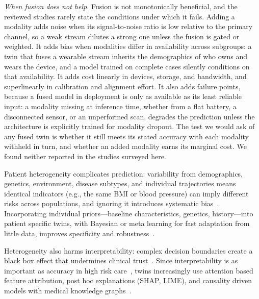 \documentclass[journal]{IEEEtran}
\begin{document}
\emph{When fusion does not help.} Fusion is not monotonically beneficial, and the reviewed studies rarely state the conditions under which it fails. Adding a modality adds noise when its signal-to-noise ratio is low relative to the primary channel, so a weak stream dilutes a strong one unless the fusion is gated or weighted. It adds bias when modalities differ in availability across subgroups: a twin that fuses a wearable stream inherits the demographics of who owns and wears the device, and a model trained on complete cases silently conditions on that availability. It adds cost linearly in devices, storage, and bandwidth, and superlinearly in calibration and alignment effort. It also adds failure points, because a fused model in deployment is only as available as its least reliable input: a modality missing at inference time, whether from a flat battery, a disconnected sensor, or an unperformed scan, degrades the prediction unless the architecture is explicitly trained for modality dropout. The test we would ask of any fused twin is whether it still meets its stated accuracy with each modality withheld in turn, and whether an added modality earns its marginal cost. We found neither reported in the studies surveyed here.

Patient heterogeneity complicates prediction: variability from demographics, genetics, environment, disease subtypes, and individual trajectories means identical indicators (e.g., the same BMI or blood pressure) can imply different risks across populations, and ignoring it introduces systematic bias~\cite{obermeyer2016predicting,rajkomar2019machine,yu2018artificial}. Incorporating individual priors---baseline characteristics, genetics, history---into patient specific twins, with Bayesian or meta learning for fast adaptation from little data, improves specificity and robustness~\cite{bjornsson2020digitaltwins}.

Heterogeneity also harms interpretability: complex decision boundaries create a black box effect that undermines clinical trust~\cite{rudin2019stopexplaining}. Since interpretability is as important as accuracy in high risk care~\cite{tonekaboni2019clinicians,lundberg2017unified,voigt2021digital}, twins increasingly use attention based feature attribution, post hoc explanations (SHAP, LIME), and causality driven models with medical knowledge graphs~\cite{ahmad2018interpretable}.
\end{document}
